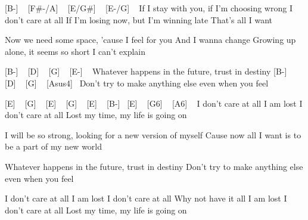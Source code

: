 
[B-] ~ [F#-/A] ~ [E/G#] ~ [E-/G] ~
If I stay with you, if I'm choosing wrong
I don't care at all
If I'm losing now, but I'm winning late
That's all I want

Now we need some space, 'cause I feel for you
And I wanna change
Growing up alone, it seems so short
I can't explain

[B-] ~ [D] ~ [G] ~ [E-] ~
Whatever happens in the future, trust in destiny
[B-] ~ [D] ~ [G] ~ [Asus4]~
Don't try to make anything else even when you feel


[E]  ~ [G] ~ [E] ~ [G] ~ [E] ~ [B-] ~[E] ~ [G6] ~ [A6] ~
I don't care at all
I am lost
I don't care at all
Lost my time, my life is going on

I will be so strong, looking for a new version of myself
Cause now all I want is to be a part of my new world

Whatever happens in the future, trust in destiny
Don't try to make anything else even when you feel

I don't care at all
I am lost
I don't care at all
Why not have it all
I am lost
I don't care at all
Lost my time, my life is going on



